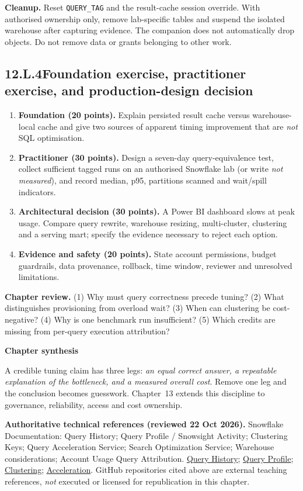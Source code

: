 \documentclass[11pt,twoside]{article}
\newcommand{\topic}[2]{\subsection*{#1\quad #2}}
\begin{document}
\textbf{Cleanup.} Reset \texttt{QUERY\_TAG} and the result-cache session override. With authorised ownership only, remove lab-specific tables and suspend the isolated warehouse after capturing evidence. The companion does not automatically drop objects. Do not remove data or grants belonging to other work.
\topic{12.L.4}{Foundation exercise, practitioner exercise, and production-design decision}
\begin{enumerate}
\item \textbf{Foundation (20 points).} Explain persisted result cache versus warehouse-local cache and give two sources of apparent timing improvement that are \emph{not} SQL optimisation.
\item \textbf{Practitioner (30 points).} Design a seven-day query-equivalence test, collect sufficient tagged runs on an authorised Snowflake lab (or write \emph{not measured}), and record median, p95, partitions scanned and wait/spill indicators.
\item \textbf{Architectural decision (30 points).} A Power BI dashboard slows at peak usage. Compare query rewrite, warehouse resizing, multi-cluster, clustering and a serving mart; specify the evidence necessary to reject each option.
\item \textbf{Evidence and safety (20 points).} State account permissions, budget guardrails, data provenance, rollback, time window, reviewer and unresolved limitations.
\end{enumerate}
\textbf{Chapter review.} (1) Why must query correctness precede tuning? (2) What distinguishes provisioning from overload wait? (3) When can clustering be cost-negative? (4) Why is one benchmark run insufficient? (5) Which credits are missing from per-query execution attribution?
\begin{insight}\textbf{Chapter synthesis}\par
A credible tuning claim has three legs: \emph{an equal correct answer, a repeatable explanation of the bottleneck, and a measured overall cost}. Remove one leg and the conclusion becomes guesswork. Chapter~13 extends this discipline to governance, reliability, access and cost ownership.\end{insight}
{\fontsize{8}{10}\selectfont\color{inkgray}\textbf{Authoritative technical references (reviewed 22 Oct 2026).} Snowflake Documentation: Query History; Query Profile / Snowsight Activity; Clustering Keys; Query Acceleration Service; Search Optimization Service; Warehouse considerations; Account Usage Query Attribution. \href{https://docs.snowflake.com/en/sql-reference/account-usage/query_history}{Query History}; \href{https://docs.snowflake.com/en/user-guide/ui-snowsight-activity}{Query Profile}; \href{https://docs.snowflake.com/en/user-guide/tables-clustering-keys}{Clustering}; \href{https://docs.snowflake.com/en/user-guide/query-acceleration-service}{Acceleration}. GitHub repositories cited above are external teaching references, \emph{not} executed or licensed for republication in this chapter.\par}
\end{document}
